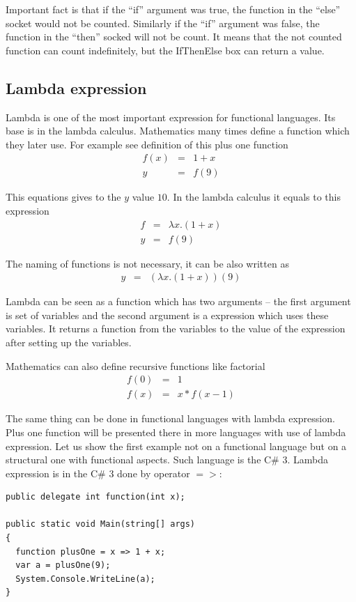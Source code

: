 \documentclass[a4paper,12pt]{book}
\begin{document}
Important fact is that if the ``if'' argument was true, the function in the ``else'' socket would not be counted. Similarly if the ``if'' argument was false, the function in the ``then'' socked will not be count. It means that the not counted function can count indefinitely, but the IfThenElse box can return a value.

\subsection{Lambda expression}
Lambda is one of the most important expression for functional languages. Its base is in the lambda calculus. Mathematics many times define a function which they later use. For example see definition of this plus one function
\begin{eqnarray*}
f(x)&=&1 + x\\
y&=&f(9)
\end{eqnarray*}

This equations gives to the $y$ value $10$. In the lambda calculus it equals to this expression
\begin{eqnarray*}
f&=&\lambda x.(1+x)\\
y&=&f(9)
\end{eqnarray*}

The naming of functions is not necessary, it can be also written as 
\begin{eqnarray*}
y&=&(\lambda x.(1+x))(9)
\end{eqnarray*}

Lambda can be seen as a function which has two arguments -- the first argument is set of variables and the second argument is a expression which uses these variables. It returns a function from the variables to the value of the expression after setting up the variables.

Mathematics can also define recursive functions like factorial
\begin{eqnarray*}
f(0)&=&1\\
f(x)&=&x * f(x - 1)
\end{eqnarray*}

The same thing can be done in functional languages with lambda expression. Plus one function will be presented there in more languages with use of lambda expression. Let us show the first example not on a functional language but on a structural one with functional aspects. Such language is the C\# 3. Lambda expression is in the C\# 3 done by operator $=>$:

\begin{verbatim}
public delegate int function(int x);

public static void Main(string[] args)
{
  function plusOne = x => 1 + x;
  var a = plusOne(9);
  System.Console.WriteLine(a);
}
\end{verbatim}
\end{document}
